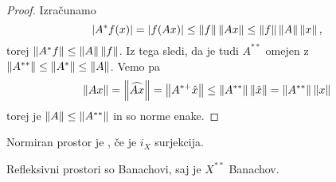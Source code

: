 \begin{proof}
  Izračunamo
  \[
	\abs{A^* f(x)} = \abs{f(Ax)} \le \norm{f} \norm{A x} \le \norm{f} \norm{A}
	\norm{x},
  \]
  torej $\norm{A^* f} \le \norm{A} \norm{f}$.
  Iz tega sledi, da je tudi $A^{**}$ omejen z $\norm{A^{**}} \le \norm{A^*} \le
  \norm{A}$.
  Vemo pa
  \[
	\norm{Ax} = \norm{\widehat{A x}} = \norm{A^{*+} \hat{x}} \le \norm{A^{**}}
	\norm{\hat{x}} = \norm{A^{**}} \norm{x}
  \]
  torej je $\norm{A} \le \norm{A^{**}}$ in so norme enake.
\end{proof}

\begin{definicija}
  Normiran prostor je , če je $i_X$ surjekcija.
\end{definicija}

\begin{opomba}
  Refleksivni prostori so Banachovi, saj je $X^{**}$ Banachov.
\end{opomba}

